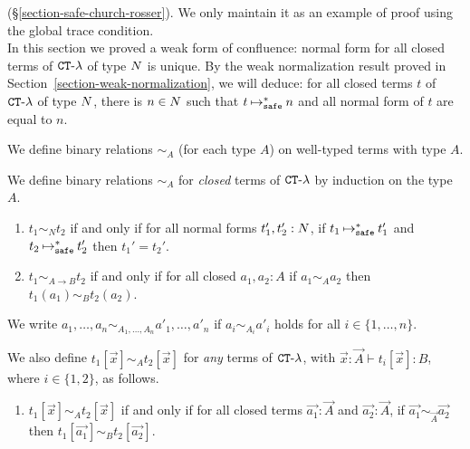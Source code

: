 
(\S \ref{section-safe-church-rosser}). 
We only maintain it as an example of proof using the global trace condition.
\\

In this section we proved a weak form of confluence: normal form for
all closed terms of ${ {\tt CT}\mbox{-}\lambda}$ of type ${N}$ is unique.
By the weak normalization result proved in Section~\ref{section-weak-normalization},
we will deduce: for all closed terms $t$ of ${ {\tt CT}\mbox{-}\lambda}$ of type ${N}$,
there is $n \in {N}$ such that $t \mathbin{\mathbin{\mapsto}_{\hbox{\scriptsize \tt safe}}^*} n$
and all normal form of $t$ are equal to $n$. 

We define binary relations $\sim_A$ (for each type $A$) on well-typed terms with type $A$.
\begin{definition}
  We define binary relations $\sim_A$ for \emph{closed} terms of ${ {\tt CT}\mbox{-}\lambda}$
  by induction on the type $A$. 
  \begin{enumerate}
  \item
    $t_1 \sim_N t_2$ if and only if for all normal forms $t_1',t_2':{N}$, if $t_1 \mathbin{\mathbin{\mapsto}_{\hbox{\scriptsize \tt safe}}^*} t_1'$
    and $t_2 \mathbin{\mathbin{\mapsto}_{\hbox{\scriptsize \tt safe}}^*} t_2'$ then $t_1' = t_2'$.
  \item
    $t_1 \sim_{A\rightarrow B} t_2$ if and only if for all closed $a_1,a_2:A$ if
    $a_1 \sim_A a_2$ then $t_1(a_1) \sim_B t_2(a_2)$.
  \end{enumerate}
  We write $a_1,\ldots,a_n \sim_{A_1,\ldots,A_n} a'_1,\ldots,a'_n$ if $a_i\sim_{A_i} a'_i$ holds
  for all $i\in\{1,\ldots,n\}$. 
  
  We also define $t_1[\vec{x}] \sim_A t_2[\vec{x}]$ for \emph{any} terms of ${ {\tt CT}\mbox{-}\lambda}$,
  with $\vec{x}:\vec{A}\vdash t_i[\vec{x}]:B$, where $i\in\{1,2\}$, as follows. 
  \begin{enumerate}
  \item[3.]
    $t_1[\vec{x}] \sim_A t_2[\vec{x}]$ if and only if
    for all closed terms $\vec{a_1}:\vec{A}$ and $\vec{a_2}:\vec{A}$,
    if $\vec{a_1}\sim_{\vec{A}}\vec{a_2}$ then $t_1[\vec{a_1}] \sim_B t_2[\vec{a_2}]$. 
  \end{enumerate}  
  
\end{definition}

